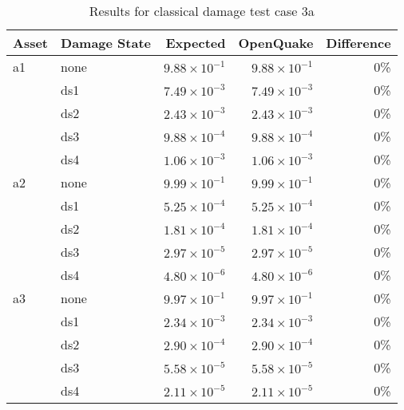\begin{table}[htbp]

\centering
\begin{tabular}{ l l r r r }

\hline
\rowcolor{anti-flashwhite}
\bf{Asset} & \bf{Damage State} & \bf{Expected} & \bf{OpenQuake} & \bf{Difference}\\
\hline
a1 & none & $9.88 \times 10^{-1}$ & $9.88 \times 10^{-1}$ & 0\% \\
   & ds1 & $7.49 \times 10^{-3}$ & $7.49 \times 10^{-3}$ & 0\% \\
   & ds2 & $2.43 \times 10^{-3}$ & $2.43 \times 10^{-3}$ & 0\% \\
   & ds3 & $9.88 \times 10^{-4}$ & $9.88 \times 10^{-4}$ & 0\% \\
   & ds4 & $1.06 \times 10^{-3}$ & $1.06 \times 10^{-3}$ & 0\% \\
\hline
a2 & none & $9.99 \times 10^{-1}$ & $9.99 \times 10^{-1}$ & 0\% \\
   & ds1 & $5.25 \times 10^{-4}$ & $5.25 \times 10^{-4}$ & 0\% \\
   & ds2 & $1.81 \times 10^{-4}$ & $1.81 \times 10^{-4}$ & 0\% \\
   & ds3 & $2.97 \times 10^{-5}$ & $2.97 \times 10^{-5}$ & 0\% \\
   & ds4 & $4.80 \times 10^{-6}$ & $4.80 \times 10^{-6}$ & 0\% \\
\hline
a3 & none & $9.97 \times 10^{-1}$ & $9.97 \times 10^{-1}$ & 0\% \\
   & ds1 & $2.34 \times 10^{-3}$ & $2.34 \times 10^{-3}$ & 0\% \\
   & ds2 & $2.90 \times 10^{-4}$ & $2.90 \times 10^{-4}$ & 0\% \\
   & ds3 & $5.58 \times 10^{-5}$ & $5.58 \times 10^{-5}$ & 0\% \\
   & ds4 & $2.11 \times 10^{-5}$ & $2.11 \times 10^{-5}$ & 0\% \\
\hline
\end{tabular}

\caption{Results for classical damage test case 3a}
\label{tab:result-cd-3a}
\end{table}